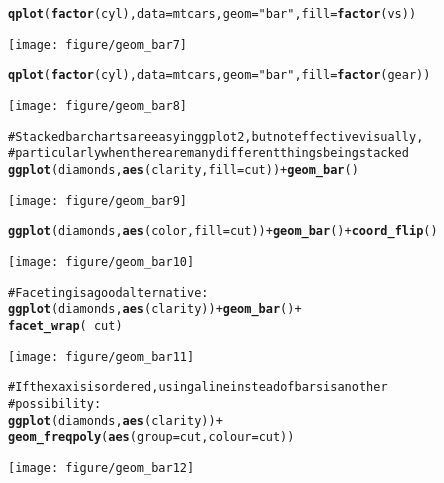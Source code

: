 \documentclass[a4paper,titlepage]{tufte-handout}\usepackage{graphicx, color}
\makeatletter
\def\maxwidth{ %
  \ifdim\Gin@nat@width>\linewidth
    \linewidth
  \else
    \Gin@nat@width
  \fi
}
\newcommand{\hlfunctioncall}[1]{\textcolor[rgb]{0.501960784313725,0,0.329411764705882}{\textbf{#1}}}%
\newcommand{\hlstring}[1]{\textcolor[rgb]{0.6,0.6,1}{#1}}%
\newcommand{\hlcomment}[1]{\textcolor[rgb]{0.180392156862745,0.6,0.341176470588235}{#1}}%
\newenvironment{kframe}{%
 \def\at@end@of@kframe{}%
 \ifinner\ifhmode%
  \def\at@end@of@kframe{\end{minipage}}%
  \begin{minipage}{\columnwidth}%
 \fi\fi%
 \def\FrameCommand##1{\hskip\@totalleftmargin \hskip-\fboxsep
 \colorbox{shadecolor}{##1}\hskip-\fboxsep
     \hskip-\linewidth \hskip-\@totalleftmargin \hskip\columnwidth}%
 \MakeFramed {\advance\hsize-\width
   \@totalleftmargin\z@ \linewidth\hsize
   \@setminipage}}%
 {\par\unskip\endMakeFramed%
 \at@end@of@kframe}
\newenvironment{knitrout}{}{} %
\makeatother
\begin{document}
\begin{knitrout}
\begin{kframe}
\begin{alltt}
\hlfunctioncall{qplot}(\hlfunctioncall{factor}(cyl), data=mtcars, geom=\hlstring{"bar"}, fill=\hlfunctioncall{factor}(vs))
\end{alltt}
\end{kframe}\texttt{[image: figure/geom\_bar7]} \begin{kframe}\begin{alltt}
\hlfunctioncall{qplot}(\hlfunctioncall{factor}(cyl), data=mtcars, geom=\hlstring{"bar"}, fill=\hlfunctioncall{factor}(gear))
\end{alltt}
\end{kframe}\texttt{[image: figure/geom\_bar8]} \begin{kframe}\begin{alltt}
\hlcomment{# Stacked bar charts are easy in ggplot2, but not effective visually,}
\hlcomment{# particularly when there are many different things being stacked}
\hlfunctioncall{ggplot}(diamonds, \hlfunctioncall{aes}(clarity, fill=cut)) + \hlfunctioncall{geom_bar}()
\end{alltt}
\end{kframe}\texttt{[image: figure/geom\_bar9]} \begin{kframe}\begin{alltt}
\hlfunctioncall{ggplot}(diamonds, \hlfunctioncall{aes}(color, fill=cut)) + \hlfunctioncall{geom_bar}() + \hlfunctioncall{coord_flip}()
\end{alltt}
\end{kframe}\texttt{[image: figure/geom\_bar10]} \begin{kframe}\begin{alltt}
\hlcomment{# Faceting is a good alternative:}
\hlfunctioncall{ggplot}(diamonds, \hlfunctioncall{aes}(clarity)) + \hlfunctioncall{geom_bar}() +
  \hlfunctioncall{facet_wrap}(~ cut)
\end{alltt}
\end{kframe}\texttt{[image: figure/geom\_bar11]} \begin{kframe}\begin{alltt}
\hlcomment{# If the x axis is ordered, using a line instead of bars is another}
\hlcomment{# possibility:}
\hlfunctioncall{ggplot}(diamonds, \hlfunctioncall{aes}(clarity)) +
  \hlfunctioncall{geom_freqpoly}(\hlfunctioncall{aes}(group = cut, colour = cut))
\end{alltt}
\end{kframe}\texttt{[image: figure/geom\_bar12]} \begin{kframe}\begin{alltt}

\end{alltt}
\end{kframe}
\end{knitrout}
\end{document}
